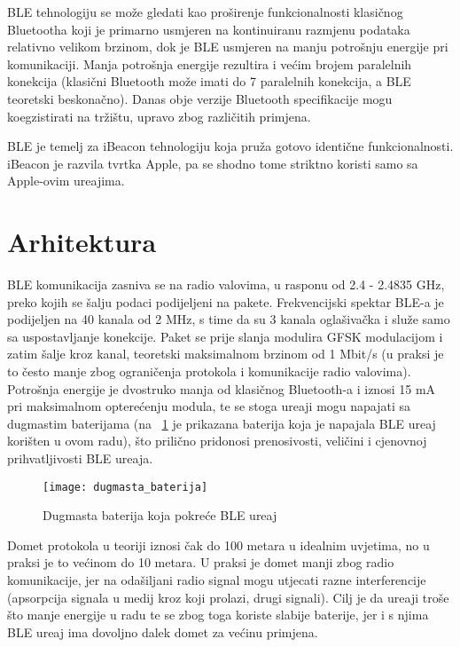 BLE tehnologiju se mo\v{z}e gledati kao pro\v{s}irenje funkcionalnosti klasi\v{c}nog Bluetootha koji je primarno usmjeren na kontinuiranu razmjenu podataka relativno velikom brzinom, dok je BLE usmjeren na manju potro\v{s}nju energije pri komunikaciji. Manja potro\v{s}nja energije rezultira i ve\'{c}im brojem paralelnih konekcija (klasi\v{c}ni Bluetooth mo\v{z}e imati do 7 paralelnih konekcija, a BLE teoretski beskona\v{c}no). Danas obje verzije Bluetooth specifikacije mogu koegzistirati na tr\v{z}i\v{s}tu, upravo zbog razli\v{c}itih primjena.

BLE je temelj za iBeacon tehnologiju koja pru\v{z}a gotovo identi\v{c}ne funkcionalnosti. iBeacon je razvila tvrtka Apple, pa se shodno tome striktno koristi samo sa Apple-ovim ure\dj ajima.

\section{Arhitektura}

BLE komunikacija zasniva se na radio valovima, u rasponu od 2.4 - 2.4835 GHz, preko kojih se \v{s}alju podaci podijeljeni na pakete. Frekvencijski spektar BLE-a je podijeljen na 40 kanala od 2 MHz, s time da su 3 kanala ogla\v{s}iva\v{c}ka i slu\v{z}e samo sa uspostavljanje konekcije. Paket se prije slanja modulira GFSK modulacijom i zatim \v{s}alje kroz kanal, teoretski maksimalnom brzinom od 1 Mbit/s (u praksi je to \v{c}esto manje zbog ograni\v{c}enja protokola i komunikacije radio valovima). Potro\v{s}nja energije je dvostruko manja od klasi\v{c}nog Bluetooth-a i iznosi 15 mA pri maksimalnom optere\'{c}enju modula, te se stoga ure\dj aji mogu napajati sa dugmastim baterijama (na ~\ref{fig:ble_baterija} je prikazana baterija koja je napajala BLE ure\dj aj kori\v{s}ten u ovom radu), \v{s}to prili\v{c}no pridonosi prenosivosti, veli\v{c}ini i cjenovnoj prihvatljivosti BLE ure\dj aja.


\begin{figure}[!htbp]
	\begin{center}
 \texttt{[image: dugmasta\_baterija]}
 \caption{Dugmasta baterija koja pokre\'{c}e BLE ure\dj aj}
 \label{fig:ble_baterija}
	\end{center}
\end{figure}

Domet protokola u teoriji iznosi \v{c}ak do 100 metara u idealnim uvjetima, no u praksi je to ve\'{c}inom do 10 metara. U praksi je domet manji zbog radio komunikacije, jer na oda\v{s}iljani radio signal mogu utjecati razne interferencije (apsorpcija signala u medij kroz koji prolazi, drugi signali). Cilj je da ure\dj aji tro\v{s}e \v{s}to manje energije u radu te se zbog toga koriste slabije baterije, jer i s njima BLE ure\dj aj ima dovoljno dalek domet za ve\'{c}inu primjena.


